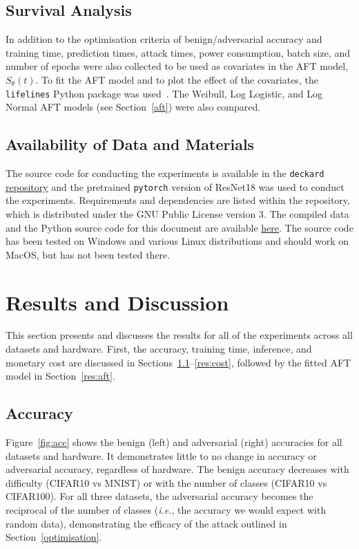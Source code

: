 \documentclass[sn-mathphys-num]{sn-jnl}%
\begin{document}
\subsection{Survival Analysis}

In addition to the optimisation criteria of benign/adversarial accuracy and training time, prediction times, attack times, power consumption, batch size, and number of epochs were also collected to be used as covariates in the AFT model, $S_{\theta}(t)$. To fit the AFT model and to plot the effect of the covariates, the \texttt{lifelines} Python package was used~\cite{lifelines}. The Weibull, Log Logistic, and Log Normal AFT models (see Section~\ref{aft}) were also compared. 

\subsection{Availability of Data and Materials}
The source code for conducting the experiments is available in the \texttt{deckard} \href{https://github.com/simplymathematics/deckard/tree/main/examples/power}{ repository} and the pretrained \texttt{pytorch} version of ResNet18 was used to conduct the experiments. Requirements and dependencies are listed within the repository, which is distributed under the GNU Public License version 3. The compiled data and the Python source code for this document are available \href{https://github.com/simplymathematics/kepler-ml}{here}. The source code has been tested on Windows and various Linux distributions and should work on MacOS, but has not been tested there.


\section{Results and Discussion}
\label{results}

This section presents and discusses the results for all of the experiments across all datasets and hardware. First, the accuracy, training time, inference, and monetary cost are discussed in Sections~\ref{res:acc}--\ref{res:cost}, followed by the fitted AFT model in Section~\ref{res:aft}.


\subsection{Accuracy}
\label{res:acc}

Figure~\ref{fig:acc} shows the benign (left) and adversarial (right) accuracies for all datasets and hardware. It demonstrates little to no change in accuracy or adversarial accuracy, regardless of hardware. The benign accuracy decreases with difficulty (CIFAR10 vs MNIST) or with the number of classes (CIFAR10 vs CIFAR100). For all three datasets, the adversarial accuracy becomes the reciprocal of the number of classes (\textit{i.e.}, the accuracy we would expect with random data), demonstrating the efficacy of the attack outlined in Section~\ref{optimisation}.
\end{document}
